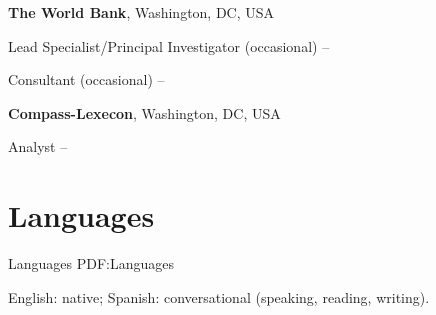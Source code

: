 \documentclass[letterpaper,10pt,oneside]{article}
\begin{document}
\begin{body}
\textbf{The World Bank},
Washington, DC, USA
\par
Lead Specialist/Principal Investigator (occasional)
\hfill
{} -- 

\smallskip


\par
Consultant (occasional)
\hfill
{} -- 

\smallskip

\textbf{Compass-Lexecon},
Washington, DC, USA
\par
Analyst
\hfill
{} --



\section
{Languages}
{Languages}
{PDF:Languages}

English: native; Spanish: conversational (speaking, reading, writing).

\newpage 


\end{body}

\label{LastPage}~
\end{document}
